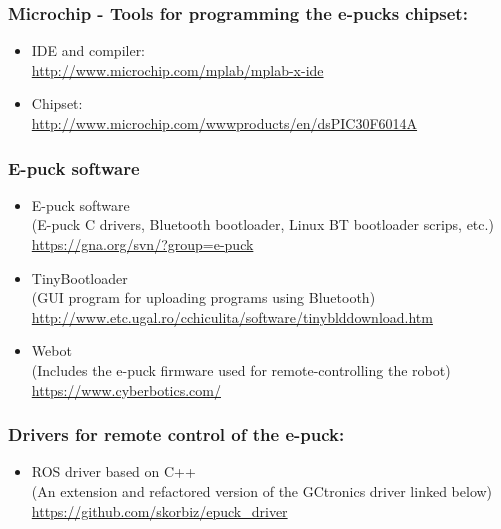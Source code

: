 \documentclass{article}
\DeclareRobustCommand{\gobblefour}[5]{} %
\newcommand*{\SkipTocEntry}{\addtocontents{toc}{\gobblefour}}
\begin{document}
\SkipTocEntry
\subsubsection{Microchip - Tools for programming the e-pucks chipset:}
\label{sec:link:microship}
\begin{itemize}
\item IDE and compiler:
\\ \url{http://www.microchip.com/mplab/mplab-x-ide}
\item Chipset:
\\ \url{http://www.microchip.com/wwwproducts/en/dsPIC30F6014A}
\end{itemize}

\SkipTocEntry
\subsubsection{E-puck software}
\label{sec:link:software}
\begin{itemize}
\item E-puck software 
\\ (E-puck C drivers, Bluetooth bootloader, Linux BT bootloader scrips, etc.)
\\ \url{https://gna.org/svn/?group=e-puck}
\item TinyBootloader 
\\ (GUI program for uploading programs using Bluetooth)
\\ \url{http://www.etc.ugal.ro/cchiculita/software/tinyblddownload.htm}
\item Webot
\\ (Includes the e-puck firmware used for remote-controlling the robot)
\\ \url{https://www.cyberbotics.com/}
\end{itemize}

\SkipTocEntry
\subsubsection{Drivers for remote control of the e-puck:}
\label{sec:link:driver}
\begin{itemize}
\item ROS driver based on C++
\\ (An extension and refactored version of the GCtronics driver linked below) 
\\ \url{https://github.com/skorbiz/epuck_driver}
\end{itemize}
\end{document}
